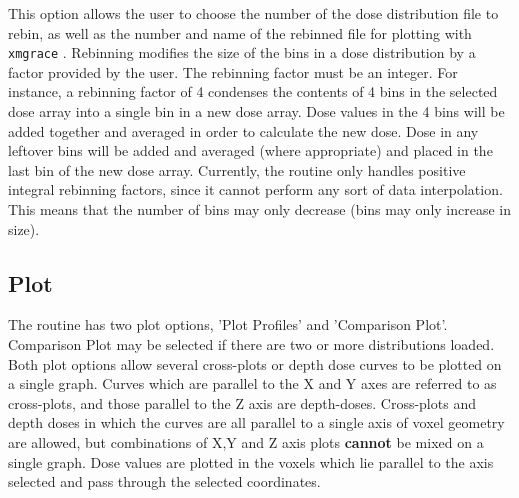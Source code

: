\documentclass[12pt,twoside]{article}
\begin{document}
This option allows the user to choose the number of the dose distribution
file  to rebin, as well as the number and name of the rebinned file for
plotting with {\tt xmgrace} . Rebinning modifies the size of the bins in
a dose distribution by a factor provided by the user. The rebinning factor
must be an integer. For instance, a rebinning factor of 4 condenses the
contents of 4 bins in the selected dose array into a single bin in a new
dose array. Dose values in the 4 bins will be added together and averaged
in order to calculate the new dose. Dose in any leftover bins will be
added and averaged (where appropriate) and placed in the last bin of the
new dose array. Currently, the routine only handles positive integral
rebinning factors, since it cannot perform any sort of data interpolation.
This means that the number of bins may only decrease (bins may only
increase in size).

\subsection{Plot}

The routine has two plot options, 'Plot Profiles' and 'Comparison Plot'.
Comparison Plot may be selected if there are two or more distributions
loaded. Both plot options allow several cross-plots or depth dose curves
to be plotted on a single graph. Curves which are parallel to the X and Y
axes are referred to as cross-plots, and those parallel to the Z axis are
depth-doses. Cross-plots and depth doses in which the curves are all
parallel to a single axis of voxel geometry are allowed, but combinations
of X,Y and Z axis plots {\bf cannot} be mixed on a single graph. Dose
values are plotted in the voxels which lie parallel to the axis selected
and pass through the selected coordinates.
\end{document}
